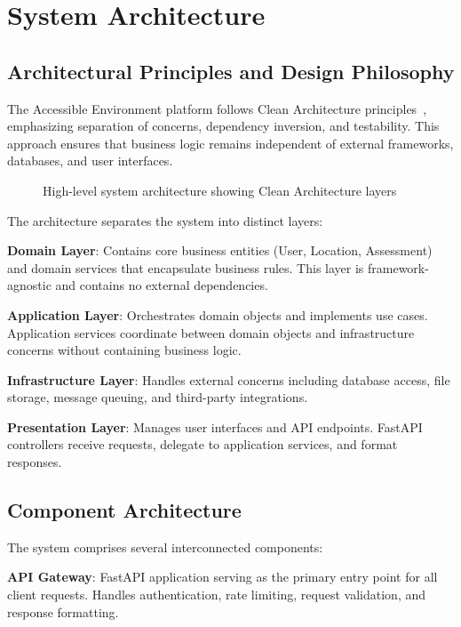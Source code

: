 \documentclass[a4paper,12pt,oneside]{book}
\begin{document}
\chapter{System Architecture}
\section{Architectural Principles and Design Philosophy}

The Accessible Environment platform follows Clean Architecture principles~\cite{martin_clean}, emphasizing separation of concerns, dependency inversion, and testability. This approach ensures that business logic remains independent of external frameworks, databases, and user interfaces.

\begin{figure}[h]
\centering
{}
\caption{High-level system architecture showing Clean Architecture layers}
\label{fig:system-architecture}
\end{figure}

The architecture separates the system into distinct layers:

\textbf{Domain Layer}: Contains core business entities (User, Location, Assessment) and domain services that encapsulate business rules. This layer is framework-agnostic and contains no external dependencies.

\textbf{Application Layer}: Orchestrates domain objects and implements use cases. Application services coordinate between domain objects and infrastructure concerns without containing business logic.

\textbf{Infrastructure Layer}: Handles external concerns including database access, file storage, message queuing, and third-party integrations.

\textbf{Presentation Layer}: Manages user interfaces and API endpoints. FastAPI controllers receive requests, delegate to application services, and format responses.

\section{Component Architecture}

The system comprises several interconnected components:

\textbf{API Gateway}: FastAPI application serving as the primary entry point for all client requests. Handles authentication, rate limiting, request validation, and response formatting.
\end{document}
